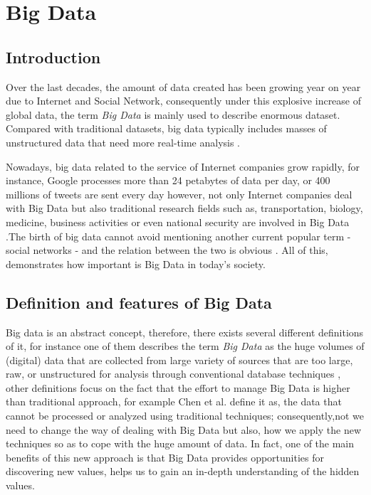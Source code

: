 \chapter{Big Data} %

\label{Chapterbigdata} %

\section{Introduction}
Over the last decades, the amount of data created has been growing year on year due to Internet and Social Network, consequently under this explosive increase of global data, the term \textit{Big Data} is mainly used to describe enormous dataset. 
Compared with traditional datasets, big data typically includes masses of unstructured data that need more real-time analysis \cite{chen2014big}.

Nowadays, big data related to the service of Internet companies grow rapidly, for instance, Google processes more than 24 petabytes of data per day, or 400 millions of tweets are sent every day \cite{john2014big} however, not only Internet companies deal with Big Data but also traditional research fields such as, transportation, biology, medicine, business activities or even national security are involved in Big Data \cite{lv2017next}.The birth of big data cannot avoid mentioning another current popular term - social networks - and the relation between the two is obvious \cite{lv2017next}. All of this, demonstrates how important is Big Data in today's society.


\section{Definition and features of Big Data}

Big data is an abstract concept, therefore, there exists several different definitions of it, for instance one of them describes the term \textit{Big Data} as the huge volumes of (digital) data that are collected from large variety of sources that are too large, raw, or unstructured for analysis through conventional database techniques \cite{kim2014big}, other definitions focus on the fact that the effort to manage Big Data is higher than traditional approach, for example Chen et al.\cite{chen2014big} define it as, the data that cannot be processed or analyzed using traditional techniques; consequently,not we need to change the way of dealing with Big Data but also, how we apply the new techniques so as to cope with the huge amount of data.
In fact, one of the main benefits of this new approach is that Big Data provides opportunities for discovering new values, helps us to gain an in-depth understanding of the hidden values. 

